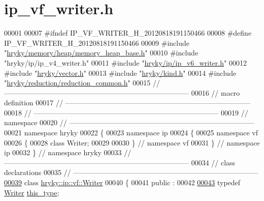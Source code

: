 \hypertarget{ip__vf__writer_8h_source}{\section{ip\-\_\-vf\-\_\-writer.\-h}
}

\begin{DoxyCode}
00001 
00007 \textcolor{preprocessor}{#ifndef IP\_VF\_WRITER\_H\_20120818191150466}
00008 \textcolor{preprocessor}{}\textcolor{preprocessor}{#define IP\_VF\_WRITER\_H\_20120818191150466}
00009 \textcolor{preprocessor}{}\textcolor{preprocessor}{#include "\hyperlink{memory__heap__base_8h}{hryky/memory/heap/memory_heap_base.h}"}
00010 \textcolor{preprocessor}{#include "hryky/ip/ip\_v4\_writer.h"}
00011 \textcolor{preprocessor}{#include "\hyperlink{ip__v6__writer_8h}{hryky/ip/ip_v6_writer.h}"}
00012 \textcolor{preprocessor}{#include "\hyperlink{vector_8h}{hryky/vector.h}"}
00013 \textcolor{preprocessor}{#include "\hyperlink{kind_8h}{hryky/kind.h}"}
00014 \textcolor{preprocessor}{#include "\hyperlink{reduction__common_8h}{hryky/reduction/reduction_common.h}"}
00015 \textcolor{comment}{//
      ------------------------------------------------------------------------------}
00016 \textcolor{comment}{// macro definition}
00017 \textcolor{comment}{//
      ------------------------------------------------------------------------------}
00018 \textcolor{comment}{//
      ------------------------------------------------------------------------------}
00019 \textcolor{comment}{// namespace}
00020 \textcolor{comment}{//
      ------------------------------------------------------------------------------}
00021 \textcolor{keyword}{namespace }hryky
00022 \{
00023 \textcolor{keyword}{namespace }ip
00024 \{
00025 \textcolor{keyword}{namespace }vf
00026 \{
00028     \textcolor{keyword}{class }Writer;
00029 
00030 \} \textcolor{comment}{// namespace vf}
00031 \} \textcolor{comment}{// namespace ip}
00032 \} \textcolor{comment}{// namespace hryky}
00033 \textcolor{comment}{//
      ------------------------------------------------------------------------------}
00034 \textcolor{comment}{// class declarations}
00035 \textcolor{comment}{//
      ------------------------------------------------------------------------------}
\hypertarget{ip__vf__writer_8h_source_l00039}{}\hyperlink{classhryky_1_1ip_1_1vf_1_1_writer}{00039} \textcolor{comment}{}\textcolor{keyword}{class }\hyperlink{classhryky_1_1ip_1_1vf_1_1_writer}{hryky::ip::vf::Writer}
00040 \{
00041 \textcolor{keyword}{public} :
00042 
\hypertarget{ip__vf__writer_8h_source_l00043}{}\hyperlink{classhryky_1_1ip_1_1vf_1_1_writer_aa50e41a90ce5f2371a4fecc1982da520}{00043}     \textcolor{keyword}{typedef} \hyperlink{classhryky_1_1ip_1_1vf_1_1_writer}{Writer} \hyperlink{classhryky_1_1ip_1_1vf_1_1_writer_aa50e41a90ce5f2371a4fecc1982da520}{this_type};

\end{DoxyCode}
